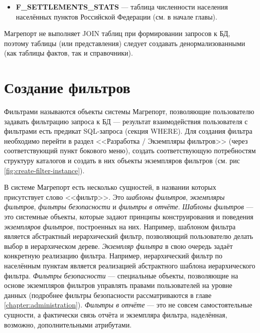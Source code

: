 \documentclass[../user-manual.tex]{subfiles}
\begin{document}
\begin{modelExample}
\begin{itemize}
			\item \textbf{F\_SETTLEMENTS\_STATS} --- таблица численности населения населённых пунктов Российской Федерации (см. в начале главы).
			
		\end{itemize}
	\end{modelExample}

	\begin{concept}
		Магрепорт не выполняет JOIN таблиц при формировании запросов к БД, поэтому таблицы (или представления) следует создавать денормализованными (как таблицы фактов, так и справочники).
	\end{concept}
	
	\section{Создание фильтров}\label{developing:filters}
	
	Фильтрами называются объекты системы Магрепорт, позволяющие пользователю задавать фильтрацию запроса к БД --- результат взаимодействия пользователя с фильтрами есть предикат SQL-запроса (секция WHERE). Для создания фильтра необходимо перейти в раздел <<Разработка / Экземпляры фильтров>> (через соответствующий пункт бокового меню), создать соответствующую потребностям структуру каталогов и создать в них объекты экземпляров фильтров (см. рис \ref{fig:create-filter-instance}).
	
	\begin{concept}
		В системе Магрепорт есть несколько сущностей, в названии которых присутствует слово <<фильтр>>. Это \textit{шаблоны фильтров}, \textit{экземпляры фильтров}, \textit{фильтры безопасности} и \textit{фильтры в отчёте}. \textit{Шаблоны фильтров} --- это системные объекты, которые задают принципы конструирования и поведения \textit{экземпляров фильтров}, построенных на них. Например, шаблоном фильтра является абстрактный иерархический фильтр, позволяющий пользователю делать выбор в иерархическом дереве. \textit{Экземпляр фильтра} в свою очередь задаёт конкретную реализацию фильтра. Например, иерархический фильтр по населённым пунктам является реализацией абстрактного шаблона иерархического фильтра. \textit{Фильтры безопасности} --- специальные объекты, позволяющие на основе экземпляров фильтров управлять правами пользователей на уровне данных (подробнее фильтры безопасности рассматриваются в главе \ref{chapter:administration}). \textit{Фильтры в отчёте} --- это не совсем самостоятельные сущности, а фактически связь отчёта и экземпляра фильтра, наделённая, возможно, дополнительными атрибутами.
	\end{concept}
\end{document}

